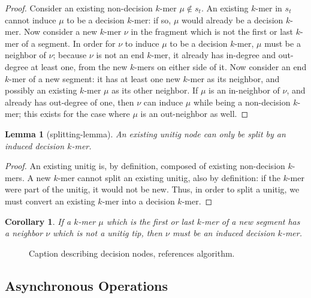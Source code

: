 \documentclass[preprint,number,12pt]{elsarticle}
\newtheorem{corollary}{Corollary}[theorem]
\newtheorem{lemma}[theorem]{Lemma}
\begin{document}
\begin{proof}
	Consider an existing non-decision $k$-mer $\mu \notin s_t$. An existing $k$-mer in $s_t$ cannot induce $\mu$ to be a decision $k$-mer: if so, $\mu$ would already be a decision $k$-mer. Now consider a new $k$-mer $\nu$ in the fragment which is not the first or last $k$-mer of a segment. In order for $\nu$ to induce $\mu$ to be a decision $k$-mer, $\mu$ must be a neighbor of $\nu$; because $\nu$ is not an end $k$-mer, it already has in-degree and out-degree at least one, from the new $k$-mers on either side of it. Now consider an end $k$-mer of a new segment: it has at least one new $k$-mer as its neighbor, and possibly an existing $k$-mer $\mu$ as its other neighbor. If $\mu$ is an in-neighbor of $\nu$, and already has out-degree of one, then $\nu$ can induce $\mu$ while being a non-decision $k$-mer; this exists for the case where $\mu$ is an out-neighbor as well.
\end{proof}

\begin{lemma}[splitting-lemma]
	\label{splitting-lemma}
	An existing unitig node can only be split by an induced decision $k$-mer.
\end{lemma}

\begin{proof}
	An existing unitig is, by definition, composed of existing non-decision $k$-mers. A new $k$-mer cannot split an existing unitig, also by definition: if the $k$-mer were part of the unitig, it would not be new. Thus, in order to split a unitig, we must convert an existing $k$-mer into a decision $k$-mer. 
\end{proof}

\begin{corollary}
	\label{tip-corollary}
	If a $k$-mer $\mu$ which is the first or last $k$-mer of a new segment has a neighbor $\nu$ which is not a unitig tip, then $\nu$ must be an induced decision $k$-mer.
\end{corollary}



\begin{figure}
	\centering
	\caption{\label{fig:disturbed-dnodes}Caption describing decision nodes, references algorithm.}
\end{figure}

\subsection{Asynchronous Operations}\label{sec:async}
\end{document}
